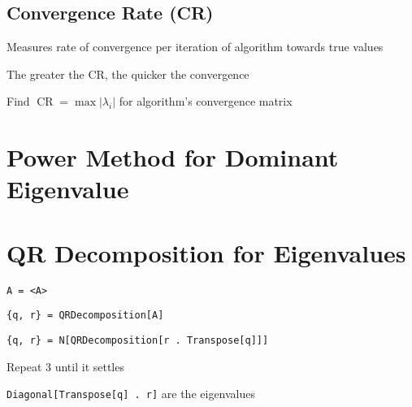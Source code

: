 \documentclass[10pt,letterpaper]{article}
\newenvironment{tight_item}
{\begin{itemize}
\setlength{\parskip}{0pt}
\setlength{\parsep}{0pt}
\setlength{\itemsep}{0pt}
\setlength{\parsep}{0pt}
\setlength{\topsep}{0pt}
\setlength{\partopsep}{0pt}
\setlength{\leftmargin}{0em}
\setlength{\labelwidth}{0em}
\setlength{\labelsep}{1em} }
{\end{itemize}}
\newenvironment{tight_enum}
{\begin{enumerate}
\setlength{\parskip}{0pt}
\setlength{\parsep}{0pt}
\setlength{\itemsep}{0pt}
\setlength{\parsep}{0pt}
\setlength{\topsep}{0pt}
\setlength{\partopsep}{0pt}
\setlength{\leftmargin}{0em}
\setlength{\labelwidth}{0em}
\setlength{\labelsep}{1em} }
{\end{enumerate}}
\begin{document}
\begin{multicols*}{2}
\subsection{Convergence Rate (CR)}
\begin{tight_item}
\item Measures rate of convergence per iteration of algorithm towards true values
\item The greater the CR, the quicker the convergence
\end{tight_item}
\begin{tight_enum}
\item Find $\operatorname{CR} = \max{|\lambda_{i}|}$ for algorithm's convergence matrix
\end{tight_enum}

\section{Power Method for Dominant Eigenvalue}


\section{QR Decomposition for Eigenvalues}
\begin{tight_enum}
\item \texttt{A = <A>}
\item \texttt{\{q, r\} = QRDecomposition[A]}
\item \texttt{\{q, r\} = N[QRDecomposition[r . Transpose[q]]]}
\item Repeat 3 until it settles
\item \texttt{Diagonal[Transpose[q] . r]} are the eigenvalues
\end{tight_enum}

\end{multicols*}
\end{document}
